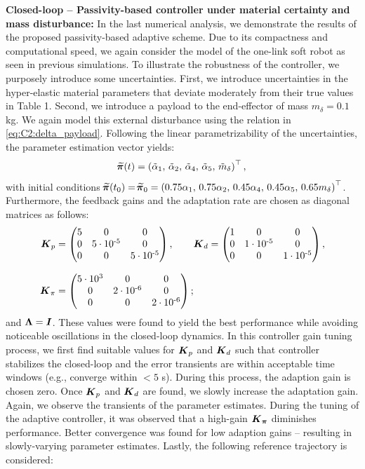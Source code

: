 \textbf{Closed-loop -- Passivity-based controller under material certainty and mass disturbance:}
In the last numerical analysis, we demonstrate the results of the proposed passivity-based adaptive scheme. Due to its compactness and computational speed, we again consider the model of the one-link soft robot as seen in previous simulations. To illustrate the robustness of the controller, we purposely introduce some uncertainties. First, we introduce uncertainties in the hyper-elastic material parameters that deviate moderately from their true values in Table 1. Second, we introduce a payload to the end-effector of mass $m_\delta = 0.1$ kg. We again model this external disturbance using the relation in \eqref{eq:C2:delta_payload}. Following the linear parametrizability of the uncertainties, the parameter estimation vector yields:
%
\begin{equation}
\widetilde{\!\boldsymbol{\pi}}(t) = \left( \tilde{\alpha}_1,\,\tilde{\alpha}_2,\,\tilde{\alpha}_4,\, \tilde{\alpha}_5,\, \tilde{m}_\delta\right)^\top,
\end{equation}
%
with initial conditions $\widetilde{\!\boldsymbol{\pi}}(t_0) = \widetilde{\!\boldsymbol{\pi}}_0 = \left(0.75 {\alpha}_1,\,0.75{\alpha}_2,\,0.45{\alpha}_4,\, 0.45{\alpha}_5,\, 0.65{m}_\delta\right)^\top$. Furthermore, the feedback gains and the adaptation rate are chosen as diagonal matrices as follows:
%
\begin{align*}
\boldsymbol{K}_p & = \begin{pmatrix} 
  5 & 0 & 0\\
  0 & 5\cdot10^{\textrm{-5}}& 0 \\ 
  0 & 0 & 5\cdot10^{\textrm{-5}}
\end{pmatrix},  \quad \quad
\boldsymbol{K}_d = \begin{pmatrix} 
  1 & 0 & 0\\
  0 & 1\cdot10^{\textrm{-5}}& 0 \\ 
  0 & 0 & 1\cdot10^{\textrm{-5}}
\end{pmatrix}, \\[0.75em]
\boldsymbol{K}_\pi & = \begin{pmatrix} 
  5\cdot10^{\textrm{3}} & 0 & 0\\
  0 & 2\cdot10^{\textrm{-6}}& 0 \\ 
  0 & 0 & 2\cdot10^{\textrm{-6}}
\end{pmatrix};
\end{align*}
%
and $\boldsymbol{\Lambda} = \boldsymbol{I}$. These values were found to yield the best performance while avoiding noticeable oscillations in the closed-loop dynamics.  In this controller gain tuning process, we first find suitable values for $\boldsymbol{K}_p$ and $\boldsymbol{K}_d$ such that controller stabilizes the closed-loop and the error transients are within acceptable time windows (e.g., converge within $<5$ s). During this process, the adaption gain is chosen zero. Once $\boldsymbol{K}_p$ and $\boldsymbol{K}_d$ are found, we slowly increase the adaptation gain. Again, we observe the transients of the parameter estimates. During the tuning of the adaptive controller, it was observed that a high-gain $\boldsymbol{K}_{\boldsymbol{\pi}}$ diminishes performance. Better convergence was found for low adaption gains -- resulting in slowly-varying parameter estimates.  Lastly, the following reference trajectory is considered:
